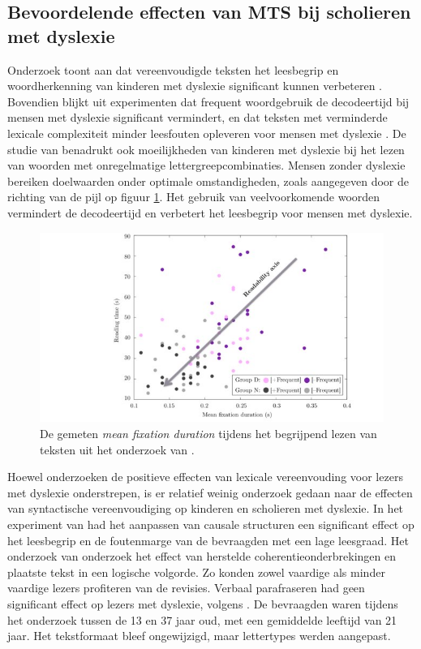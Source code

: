 \subsection{Bevoordelende effecten van MTS bij scholieren met dyslexie}

Onderzoek toont aan dat vereenvoudigde teksten het leesbegrip en woordherkenning van kinderen met dyslexie significant kunnen verbeteren \autocite{RiveroContreras2021}. Bovendien blijkt uit experimenten dat frequent woordgebruik de decodeertijd bij mensen met dyslexie significant vermindert, en dat teksten met verminderde lexicale complexiteit minder leesfouten opleveren voor mensen met dyslexie \autocite{Rello2013a, Gala2016}. De studie van \textcite{Gala2016} benadrukt ook moeilijkheden van kinderen met dyslexie bij het lezen van woorden met onregelmatige lettergreepcombinaties. Mensen zonder dyslexie bereiken doelwaarden onder optimale omstandigheden, zoals aangegeven door de richting van de pijl op figuur \ref{img:readability-mean-fixation-duration}. Het gebruik van veelvoorkomende woorden vermindert de decodeertijd en verbetert het leesbegrip voor mensen met dyslexie.

\medspace

\begin{figure}
\includegraphics[width=\linewidth]{img/readability-mean-fixation-duration.png}
\caption{De gemeten \textit{mean fixation duration} tijdens het begrijpend lezen van teksten uit het onderzoek van \textcite{Rello2013a}.}
\label{img:readability-mean-fixation-duration}
\end{figure}

\medspace

Hoewel onderzoeken de positieve effecten van lexicale vereenvouding voor lezers met dyslexie onderstrepen, is er relatief weinig onderzoek gedaan naar de effecten van syntactische vereenvoudiging op kinderen en scholieren met dyslexie. In het experiment van \textcite{Linderholm2000} had het aanpassen van causale structuren een significant effect op het leesbegrip en de foutenmarge van de bevraagden met een lage leesgraad. Het onderzoek van \textcite{Leroy2013} onderzoek het effect van herstelde coherentieonderbrekingen en plaatste tekst in een logische volgorde. Zo konden zowel vaardige als minder vaardige lezers profiteren van de revisies. Verbaal parafraseren had geen significant effect op lezers met dyslexie, volgens \textcite{Rello2013c}. De bevraagden waren tijdens het onderzoek tussen de 13 en 37 jaar oud, met een gemiddelde leeftijd van 21 jaar. Het tekstformaat bleef ongewijzigd, maar lettertypes werden aangepast.

